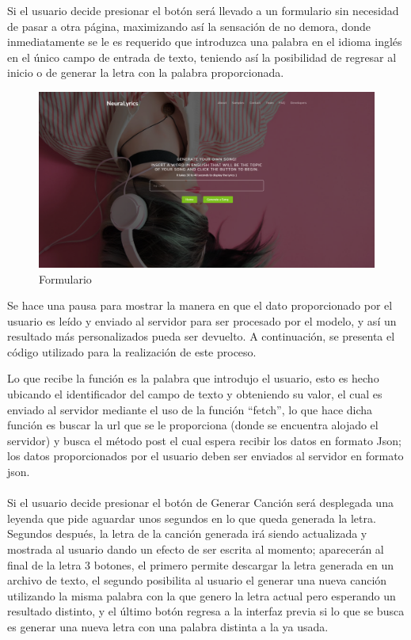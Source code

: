 \documentclass[12pt, a4paper, titlepage]{article}
\begin{document}
	Si el usuario decide presionar el botón será llevado a un formulario sin necesidad de pasar a otra página, maximizando así la sensación de no demora, donde inmediatamente se le es requerido que introduzca una palabra en el idioma inglés en el único campo de entrada de texto, teniendo así la posibilidad de regresar al inicio o de generar la letra con la palabra proporcionada.
	\begin{figure}[H]
		\includegraphics[width=13.5cm]{./Imagenes/AplicacionWeb/pform.png}
		\centering 
		\caption{Formulario}
	\end{figure}
	Se hace una pausa para mostrar la manera en que el dato proporcionado por el usuario es leído y enviado al servidor para ser procesado por el modelo, y así un resultado más personalizados pueda ser devuelto. A continuación, se presenta el código utilizado para la realización de este proceso.
	\begin{center}
		
	\end{center}
	Lo que recibe la función es la palabra que introdujo el usuario, esto es hecho ubicando el identificador del campo de texto y obteniendo su valor, el cual es enviado al servidor mediante el uso de la función “fetch”, lo que hace dicha función es buscar la url que se le proporciona (donde se encuentra alojado el servidor) y busca el método post el cual espera recibir los datos en formato Json; los datos proporcionados por el usuario deben ser enviados al servidor en formato json.\\\\
	Si el usuario decide presionar el botón de Generar Canción será desplegada una leyenda que pide aguardar unos segundos en lo que queda generada la letra. Segundos después, la letra de la canción generada irá siendo actualizada y mostrada al usuario dando un efecto de ser escrita al momento; aparecerán al final de la letra 3 botones, el primero permite descargar la letra generada en un archivo de texto, el segundo posibilita al usuario el generar una nueva canción utilizando la misma palabra con la que genero la letra actual pero esperando un resultado distinto, y el último botón regresa a la interfaz previa si lo que se busca es generar una nueva letra con una palabra distinta a la ya usada.
\end{document}
